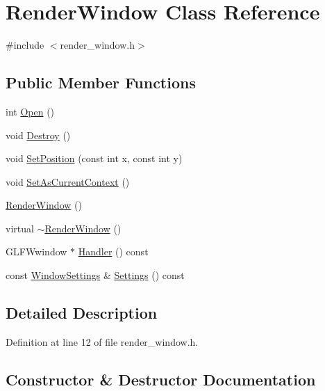 \hypertarget{class_render_window}{}\section{Render\+Window Class Reference}
\label{class_render_window}


{\ttfamily \#include $<$render\+\_\+window.\+h$>$}

\subsection*{Public Member Functions}
\begin{DoxyCompactItemize}
\item 
int \hyperlink{class_render_window_af3e5cf1cb8101909466df8e27da7d05c}{Open} ()
\item 
void \hyperlink{class_render_window_a8e655e120e85612a4a20d8694f4b8471}{Destroy} ()
\item 
void \hyperlink{class_render_window_a2bb78a935fa06ae6b8e611df90d55d76}{Set\+Position} (const int x, const int y)
\item 
void \hyperlink{class_render_window_ad3c3301e80e5893ba0766a805ef5aa78}{Set\+As\+Current\+Context} ()
\item 
\hyperlink{class_render_window_ac644ce5a7654e4cdbc5a644bd9e02952}{Render\+Window} ()
\item 
virtual \hyperlink{class_render_window_ae17a8d98de14f8ddbbedbee39cf774e0}{$\sim$\+Render\+Window} ()
\item 
G\+L\+F\+Wwindow $\ast$ \hyperlink{class_render_window_a4f707681ce58c39ae4c5205bf5bd6892}{Handler} () const 
\item 
const \hyperlink{struct_window_settings}{Window\+Settings} \& \hyperlink{class_render_window_a014909e26258d2a9f149f7e2ffe72a88}{Settings} () const 
\end{DoxyCompactItemize}


\subsection{Detailed Description}


Definition at line 12 of file render\+\_\+window.\+h.



\subsection{Constructor \& Destructor Documentation}
\hypertarget{class_render_window_ac644ce5a7654e4cdbc5a644bd9e02952}{}
